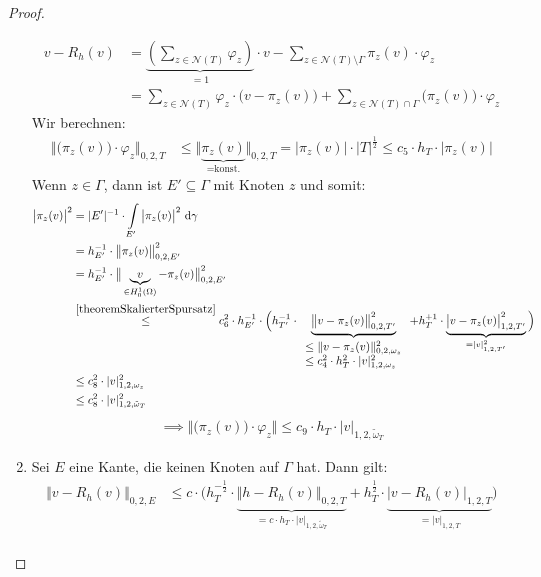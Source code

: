 \begin{proof}
\begin{enumerate}[label=\roman*)]
		\begin{align*}
			v-R_h(v)
			&=\underbrace{\left(\sum\limits_{z\in\mathcal{N}(T)}\varphi_z\right)}_{=1}\cdot v-\sum\limits_{z\in\mathcal{N}(T)\setminus\Gamma}\pi_z(v)\cdot\varphi_z\\
			&=\sum\limits_{z\in\mathcal{N}(T)}\varphi_z\cdot\big(v-\pi_z(v)\big)+\sum\limits_{z\in\mathcal{N}(T)\cap\Gamma}\big(\pi_z(v)\big)\cdot\varphi_z
		\end{align*}
		Wir berechnen:
		\begin{align*}
			\Big\Vert(\pi_z(v)\big)\cdot\varphi_z\Big\Vert_{0,2,T}
			&\leq
			\big\Vert\underbrace{\pi_z(v)}_{=\text{konst.}}\big\Vert_{0,2,T}
			=\big|\pi_z(v)\big|\cdot|T|^{\frac{1}{2}}
			\leq c_5\cdot h_T\cdot\big|\pi_z(v)\big|
		\end{align*}
		Wenn $z\in\Gamma$, dann ist $E'\subseteq\Gamma$ mit Knoten $z$ und somit:
		\begin{align*}
			\big|\pi_z(v)\big|^2
			&=|E'|^{-1}\cdot\int\limits_{E'}\big|\pi_z(v)\big|^2\text{ d}\gamma\\
			&=h_{E'}^{-1}\cdot\big\Vert\pi_z(v)\big\Vert^2_{0,2,E'}\\
			&=h_{E'}^{-1}\cdot\big\Vert\underbrace{v}_{\in H_0^1(\Omega)}-\pi_z(v)\big\Vert^2_{0,2,E'}\\
			&\stackrel{\ref{theoremSkalierterSpursatz}}{\leq}
			c_6^2\cdot h_{E'}^{-1}\cdot\Big(h_{T'}^{-1}\cdot
			\underbrace{\big\Vert v-\pi_z(v)\big\Vert_{0,2,T'}^2}
			_{
			\begin{array}{l}
				\leq\Vert v-\pi_z(v)\Vert^2_{0,2,\omega_z}\\
				\leq c_4^2\cdot h_T^2\cdot|v|^2_{1,2,\omega_z}
			\end{array}}+h_T^{+1}\cdot\underbrace{\big|v-\pi_z(v)\big|^2_{1,2,T'}}_{=|v|^2_{1,2,T'}}\Big)\\
			&\leq
			c_8^2\cdot|v|^2_{1,2,\omega_z} \\
			&\leq
			c_8^2\cdot|v|_{1,2,\tilde{\omega}_T}^2\\
		\end{align*}
		\begin{align*}
			\implies \Big\Vert\big(\pi_z(v)\big)\cdot\varphi_z\Big\Vert\leq c_9\cdot h_T\cdot|v|_{1,2,\tilde{\omega}_T}
		\end{align*}
		\item  Sei $E$ eine Kante, die keinen Knoten auf $\Gamma$ hat. Dann gilt:
		\begin{align*}
			\big\Vert v-R_h(v)\big\Vert_{0,2,E}
			&\leq
			c\cdot\Big(h_T^{-\frac{1}{2}}\cdot\underbrace{\big\Vert h-R_h(v)\big\Vert_{0,2,T}}_{=c\cdot h_T\cdot|v|_{1,2,\tilde{\omega}_T}}+h_T^{\frac{1}{2}}\cdot\underbrace{\big|v-R_h(v)\big|_{1,2,T}}_{=|v|_{1,2,T}}\Big)\\

\end{align*}
\end{enumerate}
\end{proof}

